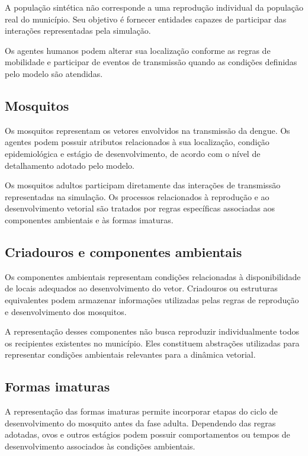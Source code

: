 A população sintética não corresponde a uma reprodução individual da população real do município. Seu objetivo é fornecer entidades capazes de participar das interações representadas pela simulação.

Os agentes humanos podem alterar sua localização conforme as regras de mobilidade e participar de eventos de transmissão quando as condições definidas pelo modelo são atendidas.

\subsection{Mosquitos}

Os mosquitos representam os vetores envolvidos na transmissão da dengue. Os agentes podem possuir atributos relacionados à sua localização, condição epidemiológica e estágio de desenvolvimento, de acordo com o nível de detalhamento adotado pelo modelo.

Os mosquitos adultos participam diretamente das interações de transmissão representadas na simulação. Os processos relacionados à reprodução e ao desenvolvimento vetorial são tratados por regras específicas associadas aos componentes ambientais e às formas imaturas.

\subsection{Criadouros e componentes ambientais}

Os componentes ambientais representam condições relacionadas à disponibilidade de locais adequados ao desenvolvimento do vetor. Criadouros ou estruturas equivalentes podem armazenar informações utilizadas pelas regras de reprodução e desenvolvimento dos mosquitos.

A representação desses componentes não busca reproduzir individualmente todos os recipientes existentes no município. Eles constituem abstrações utilizadas para representar condições ambientais relevantes para a dinâmica vetorial.

\subsection{Formas imaturas}

A representação das formas imaturas permite incorporar etapas do ciclo de desenvolvimento do mosquito antes da fase adulta. Dependendo das regras adotadas, ovos e outros estágios podem possuir comportamentos ou tempos de desenvolvimento associados às condições ambientais.

